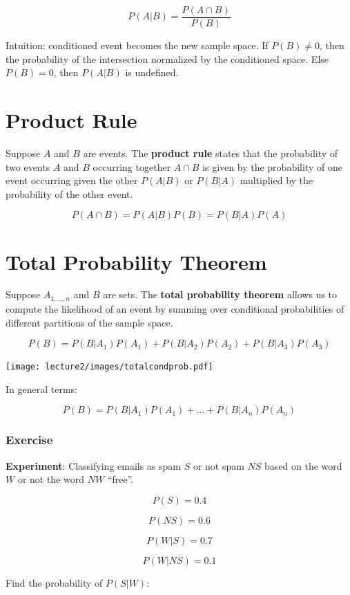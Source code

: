 \documentclass[
  letterpaper,
  DIV=11,
  numbers=noendperiod]{scrreprt}
\begin{document}
\[ 
P(A|B) = \frac{P(A \cap B)}{P(B)} 
\]

Intuition: conditioned event becomes the new sample space. If
\(P(B) \neq 0\), then the probability of the intersection normalized by
the conditioned space. Else \(P(B) = 0\), then \(P(A|B)\) is undefined.

\section{Product Rule}\label{product-rule}

Suppose \(A\) and \(B\) are events. The \textbf{product rule} states
that the probability of two events \(A\) and \(B\) occurring together
\(A \cap B\) is given by the probability of one event occurring given
the other \(P(A|B)\) or \(P(B|A)\) multiplied by the probability of the
other event.

\[ 
P(A \cap B) = P(A|B) P(B) = P(B|A) P(A) 
\]

\section{Total Probability Theorem}\label{total-probability-theorem}

Suppose \(A_{1,...,n}\) and \(B\) are sets. The \textbf{total
probability theorem} allows us to compute the likelihood of an event by
summing over conditional probabilities of different partitions of the
sample space.

\[ 
P(B) = P(B|A_1) P(A_1) + P(B|A_2) P(A_2) + P(B|A_3) P(A_3)
\]

\texttt{[image: lecture2/images/totalcondprob.pdf]}

In general terms:

\[
P(B) = P(B|A_1) P(A_1) + ... + P(B|A_n) P(A_n)
\]

\subsubsection{Exercise}\label{exercise-6}

\textbf{Experiment}: Classifying emails as spam \(S\) or not spam \(NS\)
based on the word \(W\) or not the word \(NW\) ``free''.

\[
P(S) = 0.4
\]

\[
P(NS) = 0.6
\]

\[
P(W|S) = 0.7
\]

\[
P(W|NS) = 0.1
\]

Find the probability of \(P(S|W)\):
\end{document}

